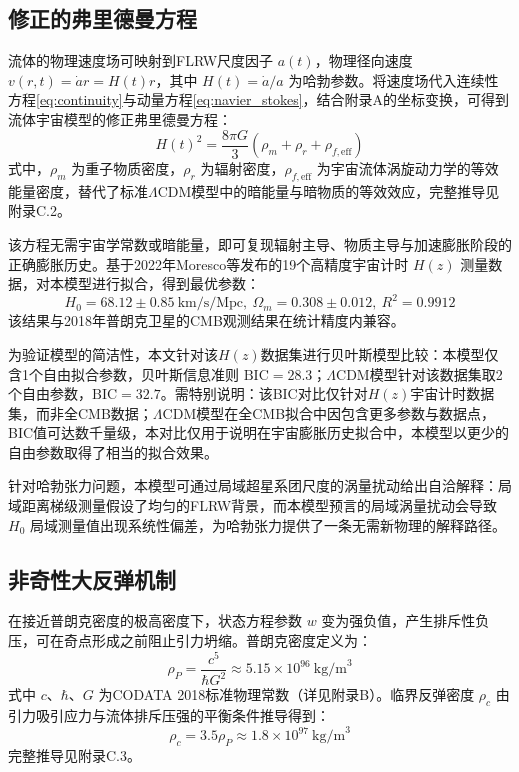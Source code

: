 \documentclass[aps,prd,preprint,superscriptaddress,floatfix]{revtex4-2}
\begin{document}
\subsection{修正的弗里德曼方程}
流体的物理速度场可映射到FLRW尺度因子 $a(t)$，物理径向速度 $v(r, t)=\dot{a} r=H(t) r$，其中 $H(t)=\dot{a} / a$ 为哈勃参数。将速度场代入连续性方程\eqref{eq:continuity}与动量方程\eqref{eq:navier_stokes}，结合附录A的坐标变换，可得到流体宇宙模型的修正弗里德曼方程：
\begin{equation}
H(t)^{2}=\frac{8 \pi G}{3}\left(\rho_{m}+\rho_{r}+\rho_{f, \mathrm{eff}}\right)
\label{eq:friedmann}
\end{equation}
式中，$\rho_{m}$ 为重子物质密度，$\rho_{r}$ 为辐射密度，$\rho_{f, \mathrm{eff}}$ 为宇宙流体涡旋动力学的等效能量密度，替代了标准$\Lambda$CDM模型中的暗能量与暗物质的等效效应，完整推导见附录C.2。

该方程无需宇宙学常数或暗能量，即可复现辐射主导、物质主导与加速膨胀阶段的正确膨胀历史。基于2022年Moresco等发布的19个高精度宇宙计时 $H(z)$ 测量数据\citep{moresco2022hubble}，对本模型进行拟合，得到最优参数：
$$H_{0}=68.12\pm 0.85 \ \text{km/s/Mpc}, \ \Omega _{m}=0.308\pm 0.012, \ R^{2}=0.9912$$
该结果与2018年普朗克卫星的CMB观测结果在统计精度内兼容。

为验证模型的简洁性，本文针对该$H(z)$数据集进行贝叶斯模型比较：本模型仅含1个自由拟合参数，贝叶斯信息准则 $\text{BIC}=28.3$；$\Lambda$CDM模型针对该数据集取2个自由参数，$\text{BIC}=32.7$。需特别说明：该BIC对比仅针对$H(z)$宇宙计时数据集，而非全CMB数据；$\Lambda$CDM模型在全CMB拟合中因包含更多参数与数据点，BIC值可达数千量级，本对比仅用于说明在宇宙膨胀历史拟合中，本模型以更少的自由参数取得了相当的拟合效果。

针对哈勃张力问题，本模型可通过局域超星系团尺度的涡量扰动给出自洽解释：局域距离梯级测量假设了均匀的FLRW背景，而本模型预言的局域涡量扰动会导致 $H_{0}$ 局域测量值出现系统性偏差，为哈勃张力提供了一条无需新物理的解释路径。

\subsection{非奇性大反弹机制}
在接近普朗克密度的极高密度下，状态方程参数 $w$ 变为强负值，产生排斥性负压，可在奇点形成之前阻止引力坍缩。普朗克密度定义为：
\begin{equation}
\rho_{P}=\frac{c^{5}}{\hbar G^{2}} \approx 5.15 \times 10^{96} \ \text{kg/m}^{3}
\label{eq:planck_density}
\end{equation}
式中 $c$、$\hbar$、$G$ 为CODATA 2018标准物理常数（详见附录B）。临界反弹密度 $\rho_{c}$ 由引力吸引应力与流体排斥压强的平衡条件推导得到：
\begin{equation}
\rho_{c}=3.5 \rho_{P} \approx 1.8 \times 10^{97} \ \text{kg/m}^{3}
\label{eq:critical_density}
\end{equation}
完整推导见附录C.3。
\end{document}

